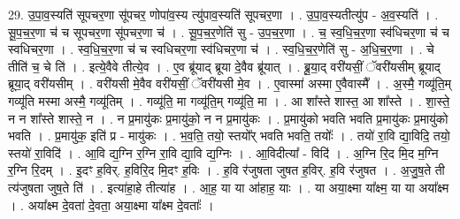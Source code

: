 \documentclass[17pt]{extarticle}
\begin{document}
29. उ॒पा॒व॒स्यति॑ सूपचर॒णा सू॑पचर॒ णोपा॑व॒स्य त्यु॑पाव॒स्यति॑ सूपचर॒णा । . उ॒पा॒व॒स्यतीत्यु॑प - अ॒व॒स्यति॑ । . सू॒प॒च॒र॒णा च॑ च सूपचर॒णा सू॑पचर॒णा च॑ । . सू॒प॒च॒र॒णेति॑ सु - उ॒प॒च॒र॒णा । . च॒ स्व॒धि॒च॒र॒णा स्व॑धिचर॒णा च॑ च स्वधिचर॒णा । . स्व॒धि॒च॒र॒णा च॑ च स्वधिचर॒णा स्व॑धिचर॒णा च॑ । . स्व॒धि॒च॒र॒णेति॑ सु - अ॒धि॒च॒र॒णा । . चे तीति॑ च॒ चे ति॑ । . इत्ये॒वैवे तीत्ये॒व । . ए॒व ब्रू॑याद् ब्रूया दे॒वैव ब्रू॑यात् । . ब्रू॒या॒द् वरी॑यसीं॒ ॅवरी॑यसीम् ब्रूयाद् ब्रूया॒द् वरी॑यसीम् । . वरी॑यसी मे॒वैव वरी॑यसीं॒ ॅवरी॑यसी मे॒व । . ए॒वास्मा॑ अस्मा ए॒वैवास्मै᳚ । . अ॒स्मै॒ गव्यू॑ति॒म् गव्यू॑ति मस्मा अस्मै॒ गव्यू॑तिम् । . गव्यू॑ति॒ मा गव्यू॑ति॒म् गव्यू॑ति॒ मा । . आ शा᳚स्ते शास्त॒ आ शा᳚स्ते । . शा॒स्ते॒ न न शा᳚स्ते शास्ते॒ न । . न प्र॒मायु॑कः प्र॒मायु॑को॒ न न प्र॒मायु॑कः । . प्र॒मायु॑को भवति भवति प्र॒मायु॑कः प्र॒मायु॑को भवति । . प्र॒मायु॑क॒ इति॑ प्र - मायु॑कः । . भ॒व॒ति॒ तयो॒ स्तयो᳚र् भवति भवति॒ तयोः᳚ । . तयो॑ रा॒वि द्या॒विदि॒ तयो॒ स्तयो॑ रा॒विदि॑ । . आ॒वि द्य॒ग्नि र॒ग्नि रा॒वि द्या॒वि द्य॒ग्निः । . आ॒विदीत्या᳚ - विदि॑ । . अ॒ग्नि रि॒द मि॒द म॒ग्नि र॒ग्नि रि॒दम् । . इ॒दꣳ ह॒विर्. ह॒विरि॒द मि॒दꣳ ह॒विः । . ह॒वि र॑जुषता जुषत ह॒विर्. ह॒वि र॑जुषत । . अ॒जु॒ष॒ते ती त्य॑जुषता जुष॒ते ति॑ । . इत्या॑हा॒हे तीत्या॑ह । . आ॒ह॒ या या आ॑हाह॒ याः । . या अया॒क्ष्मा या᳚क्ष्म॒ या या अया᳚क्ष्म । . अया᳚क्ष्म दे॒वता॑ दे॒वता॒ अया॒क्ष्मा या᳚क्ष्म दे॒वताः᳚ । \newline
\end{document}
